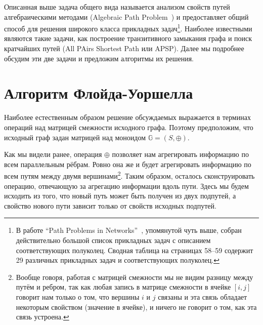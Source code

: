 Описанная выше задача общего вида называется анализом свойств путей алгебраическими методами (Algebraic Path Problem~\cite{Baras2010PathPI}) и предоставляет общий способ для решения широкого класса прикладных задач\footnote{В работе ``Path Problems in Networks''~\cite{Baras2010PathPI}, упомянутой чуть выше, собран действительно большой список прикладных задач с описанием соответствующих полуколец. Сводная таблица на страницах 58--59 содержит 29 различных прикладных задач и соответствующих полуколец.}. Наиболее известными являются такие задачи, как построение транзитивного замыкания графа и поиск кратчайших путей (All PAirs Shortest Path или APSP). Далее мы подробнее обсудим эти две задачи и предложим алгоритмы их решения.


\section{Алгоритм Флойда-Уоршелла}

Наиболее естественным образом решение обсуждаемых выражается в терминах операций над матрицей смежности исходного графа. Поэтому предположим, что исходный граф задан матрицей над моноидом $\mathbb{G} = (S,\oplus)$.

Как мы видели ранее, операция $\oplus$ позволяет нам агрегировать информацию по всем параллельным рёбрам. Ровно она же и будет агрегировать информацию по всем путям между двумя вершинами\footnote{Вообще говоря, работая с матрицей смежности мы не видим разницу между путём и ребром, так как любая запись в матрице смежности в ячейке $[i,j]$ говорит нам только о том, что вершины $i$ и $j$ связаны и эта связь обладает некоторым свойством (значение в ячейке), и ничего не говорит о том, как эта связь устроена.}. Таким образом, осталось сконструировать операцию, отвечающую за агрегацию информации вдоль пути. Здесь мы будем исходить из того, что новый путь может быть получен из двух подпутей, а свойство нового пути зависит только от свойств исходных подпутей.

